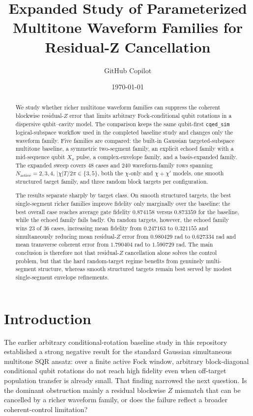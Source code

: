 \documentclass[aps,pra,twocolumn,reprint,floatfix,amsmath,amssymb]{revtex4-2}
\begin{document}
\title{Expanded Study of Parameterized Multitone Waveform Families for Residual-Z Cancellation}
\author{GitHub Copilot}
\date{\today}

\begin{abstract}
We study whether richer multitone waveform families can suppress the coherent blockwise residual-$Z$ error that limits arbitrary Fock-conditional qubit rotations in a dispersive qubit--cavity model. The comparison keeps the same qubit-first \texttt{cqed\_sim} logical-subspace workflow used in the completed baseline study and changes only the waveform family. Five families are compared: the built-in Gaussian targeted-subspace multitone baseline, a symmetric two-segment family, an explicit echoed family with a mid-sequence qubit $X_\pi$ pulse, a complex-envelope family, and a basis-expanded family. The expanded sweep covers $48$ cases and $240$ waveform-family rows spanning $N_{\mathrm{active}} = 2,3,4$, $|\chi|T/2\pi \in \{3,5\}$, both the $\chi$-only and $\chi+\chi'$ models, one smooth structured target family, and three random block targets per configuration.

The results separate sharply by target class. On smooth structured targets, the best single-segment richer families improve fidelity only marginally over the baseline: the best overall case reaches average gate fidelity $0.874158$ versus $0.873359$ for the baseline, while the echoed family fails badly. On random targets, however, the echoed family wins $23$ of $36$ cases, increasing mean fidelity from $0.247163$ to $0.321155$ and simultaneously reducing mean residual-$Z$ error from $0.980429$ rad to $0.627334$ rad and mean transverse coherent error from $1.790404$ rad to $1.590729$ rad. The main conclusion is therefore not that residual-$Z$ cancellation alone solves the control problem, but that the hard random-target regime benefits from genuinely multi-segment structure, whereas smooth structured targets remain best served by modest single-segment envelope refinements.
\end{abstract}

\maketitle

\section{Introduction}
The earlier arbitrary conditional-rotation baseline study in this repository established a strong negative result for the standard Gaussian simultaneous multitone SQR ansatz: over a finite active Fock window, arbitrary block-diagonal conditional qubit rotations do not reach high fidelity even when off-target population transfer is already small. That finding narrowed the next question. Is the dominant obstruction mainly a residual blockwise $Z$ mismatch that can be cancelled by a richer waveform family, or does the failure reflect a broader coherent-control limitation?
\end{document}
